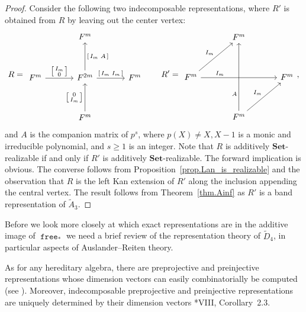 \documentclass[a4paper]{amsart}
\theoremstyle{plain}
\theoremstyle{definition}
\theoremstyle{remark}
\newcommand{\funct}[1]{\operatorname{\mathtt{#1}}}
\newcommand{\Set}{\mathbf{Set}}
\begin{document}
\begin{proof}
Consider the following two indecomposable representations, where $R'$ is obtained from $R$ by leaving out the center vertex: \[
R=\begin{tikzcd}[sep=12mm, ampersand replacement = \&]
\& F^m\&  \\
F^m \ar[r, "{\left[ \begin{smallmatrix} I_m \\ 0 \end{smallmatrix} \right]}"] \& F^{2m}\ar[u,swap, "{\left[ \begin{smallmatrix} I_m & A \end{smallmatrix} \right]}"] \ar[r, "{\left[ \begin{smallmatrix} I_m & I_m \end{smallmatrix} \right]}"] \& F^m \\
\& F^m \ar[u, "{\left[ \begin{smallmatrix} 0 \\ I_m \end{smallmatrix} \right]}"]  \& \end{tikzcd} 
\qquad R' =
\begin{tikzcd}[sep=12mm, ampersand replacement = \&]
\& F^m\&  \\
F^m\ar[ur, "I_m"]\ar[rr, near start, "I_m"]  \& \& F^m \\
\& F^m \ar[ur, "I_m"] \ar[uu, near start, "A"]  \& \end{tikzcd},
\]
and $A$ is the companion matrix of $p^s$, where $p(X)\neq X, X-1$ is a monic and irreducible polynomial, and $s\geq 1$ is an integer. Note that $R$ is additively $\Set$-realizable if and only if $R'$ is additively $\Set$-realizable. The forward implication is obvious. The converse follows from Proposition~\ref{prop.Lan_is_realizable} and the observation that $R$ is the left Kan extension of $R'$ along the inclusion appending the central vertex. The result follows from Theorem~\ref{thm.Ainf} as $R'$ is a band representation of $\tilde{A}_3$.
\end{proof}

Before we look more closely at which exact representations are in the additive image of \( \funct{free}_* \) we need a brief review of the representation theory of \( \tilde{D}_4 \), in particular aspects of Auslander--Reiten theory.

As for any hereditary algebra, there are preprojective and preinjective representations whose dimension vectors can easily combinatorially be computed (see \cite{AR}). Moreover, indecomposable preprojective and preinjective representations are uniquely determined by their dimension vectors \cite{AR}*{VIII, Corollary~2.3}.
\end{document}
